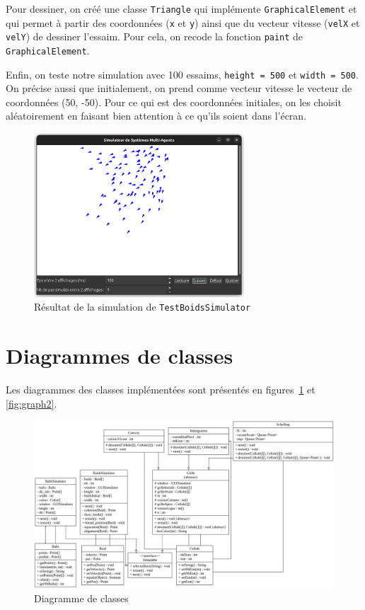 \documentclass[a4paper, 11pt, french]{article}
\begin{document}
Pour dessiner, on créé une classe \verb|Triangle| qui implémente \verb|GraphicalElement| et qui permet à partir des coordonnées (\verb|x| et \verb|y|) ainsi que du vecteur vitesse (\verb|velX| et \verb|velY|) de dessiner l'essaim. Pour cela, on recode la fonction \verb|paint| de \verb|GraphicalElement|.

Enfin, on teste notre simulation avec 100 essaims, \verb|height = 500| et \verb|width = 500|. On précise aussi que initialement, on prend comme vecteur vitesse le vecteur de coordonnées (50, -50). Pour ce qui est des coordonnées initiales, on les choisit aléatoirement en faisant bien attention à ce qu'ils soient dans l'écran.

\begin{figure}[H]
    \centering
    \includegraphics[width=0.7\textwidth]{TestBoidsSimulator.png}
    \caption{Résultat de la simulation de \texttt{TestBoidsSimulator}}
\end{figure}

\newpage

\section{Diagrammes de classes}

Les diagrammes des classes implémentées sont présentés en figures~\ref{fig:graph1} et \ref{fig:graph2}.

\begin{figure}[H]
    \centering
    \includegraphics[width=\textwidth]{graph1.png}
    \caption{Diagramme de classes}
    \label{fig:graph1}
\end{figure}
\end{document}
